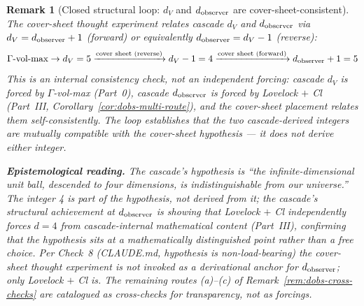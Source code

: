 \documentclass[12pt,a4paper]{article}
\newtheorem*{remark}{Remark}
\begin{document}
\begin{remark}[Closed structural loop: $d_V$ and $d_{\rm observer}$ are cover-sheet-consistent]\label{rem:dobs-closed-loop}
The cover-sheet thought experiment relates cascade $d_V$ and $d_{\rm observer}$ via $d_V = d_{\rm observer}+1$ (forward) or equivalently $d_{\rm observer} = d_V - 1$ (reverse):
\[
\Gamma\text{-vol-max} \to d_V = 5 \xrightarrow{\text{cover sheet (reverse)}} d_V - 1 = 4 \xrightarrow{\text{cover sheet (forward)}} d_{\rm observer} + 1 = 5
\]
This is an \emph{internal consistency check}, not an independent forcing: cascade $d_V$ is forced by $\Gamma$-vol-max (Part~0), cascade $d_{\rm observer}$ is forced by Lovelock $+$ Cl (Part~III, Corollary~\ref{cor:dobs-multi-route}), and the cover-sheet placement relates them self-consistently. The loop establishes that the two cascade-derived integers are mutually compatible with the cover-sheet hypothesis --- it does not derive either integer.

\medskip\noindent\textbf{Epistemological reading.} The cascade's hypothesis is ``the infinite-dimensional unit ball, descended to \emph{four} dimensions, is indistinguishable from our universe.'' The integer 4 is part of the hypothesis, not derived from it; the cascade's structural achievement at $d_{\rm observer}$ is showing that Lovelock $+$ Cl independently forces $d=4$ from cascade-internal mathematical content (Part~III), confirming that the hypothesis sits at a mathematically distinguished point rather than a free choice. Per Check~8 (CLAUDE.md, hypothesis is non-load-bearing) the cover-sheet thought experiment is not invoked as a derivational anchor for $d_{\rm observer}$; only Lovelock $+$ Cl is. The remaining routes (a)--(c) of Remark~\ref{rem:dobs-cross-checks} are catalogued as cross-checks for transparency, not as forcings.
\end{remark}
\end{document}
